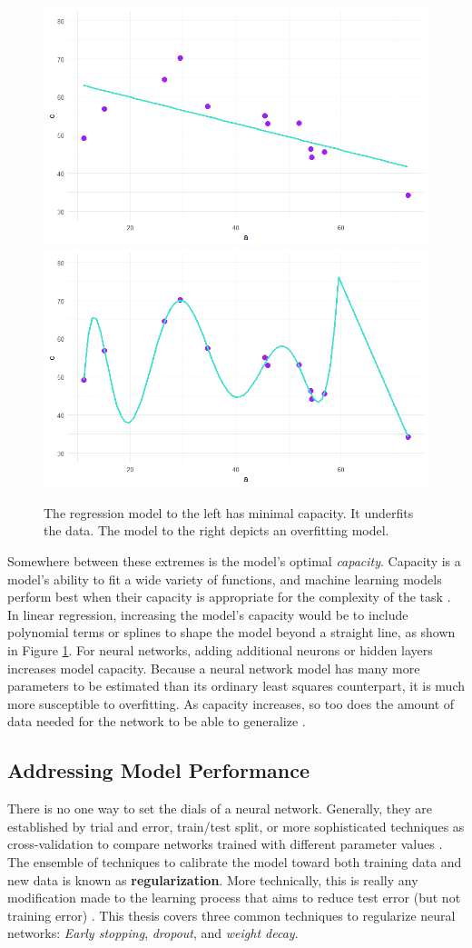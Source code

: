  \begin{figure}[H]
    \includegraphics[width=0.5\linewidth]{Figures/underfit.png}
    \includegraphics[width=0.5\linewidth]{Figures/overfit.png}
    \vspace{-20pt}
    \caption{\footnotesize{The regression model to the left has minimal capacity.  It underfits the data. The model to the right depicts an overfitting model.}}
    \label{capacityviz}
\end{figure}
 
 Somewhere between these extremes is the model's optimal \textit{capacity}.  Capacity is a model's ability to fit a wide variety of functions, and machine learning models perform best when their capacity is appropriate for the complexity of the task \cite{Goodfellow-et-al-2016}.  In linear regression, increasing the model's capacity would be to include polynomial terms or splines to shape the model beyond a straight line, as shown in Figure \ref{capacityviz}.  For neural networks, adding additional neurons or hidden layers increases model capacity.
 Because a neural network model has many more parameters to be estimated than its ordinary least squares counterpart, it is much more susceptible to overfitting.  As capacity increases, so too does the amount of data needed for the network to be able to generalize \cite{baum1988size}.


\subsection{Addressing Model Performance}

There is no one way to set the dials of a neural network.  Generally, they are established by trial and error, train/test split, or more sophisticated techniques as cross-validation to compare networks trained with different parameter values \cite{mackay1992practical}.  The ensemble of techniques to calibrate the model toward both training data and new data is known as \textbf{regularization}.  More technically, this is really any modification made to the learning process that aims to reduce test error (but not training error) \cite{Goodfellow-et-al-2016}.  This thesis covers three common techniques to regularize neural networks: \textit{Early stopping}, \textit{dropout}, and \textit{weight decay}.

